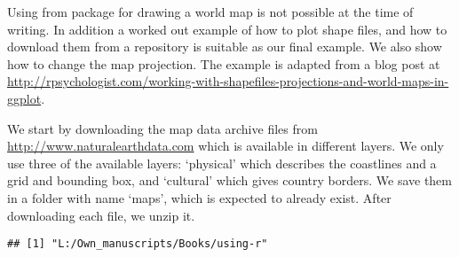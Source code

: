 \documentclass[paper=a4,10pt,div=17,headsepline,BCOR=12mm,twoside,open=right]{scrbook}\usepackage{knitr}
\begin{document}
Using  from package  for drawing a world map is not possible at the time of writing. In addition a worked out example of how to plot shape files, and how to download them from a repository is suitable as our final example. We also show how to change the map projection. The example is adapted from a blog post at \url{http://rpsychologist.com/working-with-shapefiles-projections-and-world-maps-in-ggplot}.

We start by downloading the map data archive files from \url{http://www.naturalearthdata.com} which is available in different layers. We only use three of the available layers: `physical' which describes the coastlines and a grid and bounding box, and `cultural' which gives country borders. We save them in a folder with name `maps', which is expected to already exist. After downloading each file, we unzip it.



\begin{knitrout}\footnotesize
{}\color{fgcolor}\begin{kframe}
\begin{alltt}
\hlstd{()}
\end{alltt}
\begin{verbatim}
## [1] "L:/Own_manuscripts/Books/using-r"
\end{verbatim}
\begin{alltt}
 \hlkwb{<-} \hlstd{(}\hlstd{)}

 \hlkwb{<-}

\hlstd{(}
                    \hlstd{,}
                    \hlstd{=}\hlstd{),} \hlstd{)}
\hlstd{(}\hlstd{)}

\hlstd{(}
                    \hlstd{,}
                    \hlstd{=}\hlstd{),} \hlstd{)}
\hlstd{(}\hlstd{)}

\hlstd{(}
                    \hlstd{,}
                    \hlstd{=}\hlstd{),} \hlstd{)}
\hlstd{(}\hlstd{)}

\end{alltt}
\end{kframe}
\end{knitrout}
\end{document}
